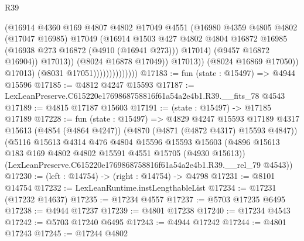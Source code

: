 \begin{lexlean}{R39}
\begin{coremodule}
                                          (@16914
                                            @4360
                                            @169
                                            @4807
                                            @4802
                                            @17049
                                            @4551
                                            (@16980
                                              @4359
                                              @4805
                                              @4802
                                              (@17047 @16985)
                                              @17049
                                              (@16914
                                                @1503
                                                @427
                                                @4802
                                                @4804
                                                @16872
                                                @16985
                                                (@16938 @273 @16872 (@4910 (@16941 @273)))
                                                @17014)
                                              (@9457 @16872 @16904))
                                            @17013))
                                        (@8024 @16878 @17049))
                                      @17013))
                                  (@8024 @16869 @17050))
                                @17013)
                              (@8031 @17051))))))))))))))
@17183 := fun (state : @15497) => @4944 @15596
@17185 := @4812 @4247 @15593
@17187 := LexLeanPreserve.C615220e1769868758816f61a54a2e4b1.R39.__fits_78 @4543
@17189 := @4815 @17187 @15603
@17191 := (state : @15497) -> @17185 @17189
@17228 := fun (state : @15497) =>
  @4829
    @4247
    @15593
    @17189
    @4317
    @15613
    (@4854 (@4864 @4247))
    (@4870 (@4871 (@4872 @4317) @15593 @4847))
    (@5116
      @15613
      @4314
      @476
      @4804
      @15596
      @15593
      @15603
      (@4896 @15613 @183 @169 @4802 @4802 @15591 @4551 @15705 (@4930 @15613))
      (LexLeanPreserve.C615220e1769868758816f61a54a2e4b1.R39.__rel_79 @4543))
@17230 := (left : @14754) -> (right : @14754) -> @4798
@17231 := @8101 @14754
@17232 := LexLeanRuntime.instLengthableList
@17234 := @17231 (@17232 @14637)
@17235 := @17234 @4557
@17237 := @5703 @17235 @6495
@17238 := @4944 @17237
@17239 := @4801 @17238
@17240 := @17234 @4543
@17242 := @5703 @17240 @6495
@17243 := @4944 @17242
@17244 := @4801 @17243
@17245 := @17244 @4802

\end{coremodule}
\end{lexlean}
